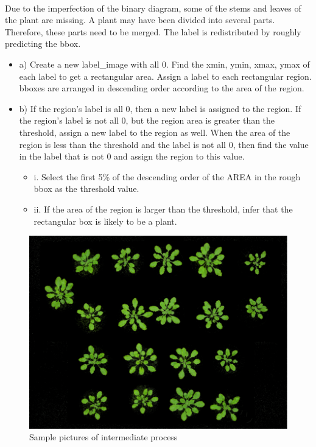 \documentclass[conference]{IEEEtran}
\begin{document}
\paragraph{}Due to the imperfection of the binary diagram, some of the stems and leaves of the plant are missing. A plant may have been divided into several parts. Therefore, these parts need to be merged. The label is redistributed by roughly predicting the bbox.
\begin{itemize}
\item a) Create a new label\_image with all 0. Find the xmin, ymin, xmax, ymax of each label to get a rectangular area. Assign a label to each rectangular region. bboxes are arranged in descending order according to the area of the region.
\item b) If the region's label is all 0, then a new label is assigned to the region. If the region's label is not all 0, but the region area is greater than the threshold, assign a new label to the region as well. When the area of the region is less than the threshold and the label is not all 0, then find the value in the label that is not 0 and assign the region to this value.
\begin{itemize}
\item i. Select the first 5\% of the descending order of the AREA in the rough bbox as the threshold value.
\item ii. If the area of the region is larger than the threshold, infer that the rectangular box is likely to be a plant.
\end{itemize}
\end{itemize}

\begin{figure}[htbp]
\centerline{\includegraphics[scale=0.45]{T21.png}}
\caption{Sample pictures of intermediate process }
\label{fig1}
\end{figure}
\end{document}
